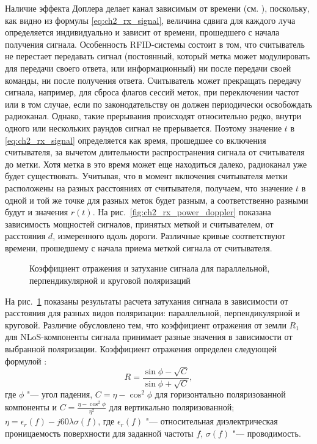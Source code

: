 Наличие эффекта Доплера делает канал зависимым от времени (см. \cite{Matz2011}), поскольку, как видно из формулы \eqref{eq:ch2_rx_signal}, величина сдвига для каждого луча определяется индивидуально и зависит от времени, прошедшего с начала получения сигнала. Особенность RFID-системы состоит в том, что считыватель не перестает передавать сигнал (постоянный, который метка может модулировать для передачи своего ответа, или информационный) ни после передачи своей команды, ни после получения ответа. Считыватель может прекращать передачу сигнала, например, для сброса флагов сессий меток, при переключении частот или в том случае, если по законодательству он должен периодически освобождать радиоканал. Однако, такие прерывания происходят относительно редко, внутри одного или нескольких раундов сигнал не прерывается. Поэтому значение $t$ в \eqref{eq:ch2_rx_signal} определяется как время, прошедшее со включения считывателя, за вычетом длительности распространения сигнала от считывателя до метки. Хотя метка в это время может еще находиться далеко, радиоканал уже будет существовать. Учитывая, что в момент включения считывателя метки расположены на разных расстояниях от считывателя, получаем, что значение $t$ в одной и той же точке для разных меток будет разным, а соответственно разными будут и значения $r(t)$. На рис.~\ref{fig:ch2_rx_power_doppler} показана зависимость мощностей сигналов, принятых меткой и считывателем, от расстояния $d$, измеренного вдоль дороги. Различные кривые соответствуют времени, прошедшему с начала приема меткой сигнала от считывателя.

\begin{figure}[h]
	\caption{Коэффициент отражения и затухание сигнала для параллельной, перпендикулярной и круговой поляризаций}
	\label{fig:ch2_pathloss}
\end{figure}

На рис.~\ref{fig:ch2_pathloss} показаны результаты расчета затухания сигнала в зависимости от расстояния для разных видов поляризации: параллельной, перпендикулярной и круговой. Различие обусловлено тем, что коэффициент отражения от земли $R_1$ для NLoS-компоненты сигнала принимает разные значения в зависимости от выбранной поляризации. Коэффициент отражения определен следующей формулой \cite{Gonzalez2013}:
$$
  R = \frac{\sin\phi - \sqrt{C}}{\sin\phi + \sqrt{C}},
$$
где $\phi$ "--- угол падения, $C = \eta - \cos^2\phi$ для горизонтально поляризованной компоненты и $C = \frac{\eta - \cos^2\phi}{\eta^2}$ для вертикально поляризованной; $\eta = \epsilon_r(f)-j60\lambda\sigma(f)$, где $\epsilon_r(f)$ "--- относительная диэлектрическая проницаемость поверхности для заданной частоты $f$, $\sigma(f)$ "--- проводимость.

